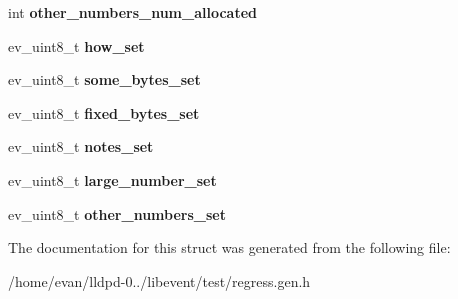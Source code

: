 \begin{DoxyCompactItemize}
\item 
int {\bfseries other\-\_\-numbers\-\_\-num\-\_\-allocated}\label{structrun_a58834498c35c5777095faaaec658addd}

\item 
ev\-\_\-uint8\-\_\-t {\bfseries how\-\_\-set}\label{structrun_a18c97255e634e2f4e24f9ef87aef0474}

\item 
ev\-\_\-uint8\-\_\-t {\bfseries some\-\_\-bytes\-\_\-set}\label{structrun_aabe91fef92d533a035161776da315067}

\item 
ev\-\_\-uint8\-\_\-t {\bfseries fixed\-\_\-bytes\-\_\-set}\label{structrun_a0094c7dd5f52b2e6c95315c18814bb91}

\item 
ev\-\_\-uint8\-\_\-t {\bfseries notes\-\_\-set}\label{structrun_ad03b473f1e590cdf48035c40546171e2}

\item 
ev\-\_\-uint8\-\_\-t {\bfseries large\-\_\-number\-\_\-set}\label{structrun_a157cda7247d94ea62aeb32362ce81018}

\item 
ev\-\_\-uint8\-\_\-t {\bfseries other\-\_\-numbers\-\_\-set}\label{structrun_a2c64f3662273f631e575b3745c525229}

\end{DoxyCompactItemize}


\-The documentation for this struct was generated from the following file\-:\begin{DoxyCompactItemize}
\item 
/home/evan/lldpd-\/0../libevent/test/regress.\-gen.\-h\end{DoxyCompactItemize}
